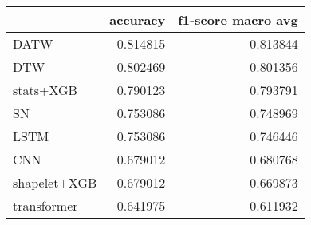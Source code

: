\begin{tabular}{lrr}
\toprule
 & accuracy & f1-score macro avg \\
\midrule
DATW & {\cellcolor[HTML]{08306B}} \color[HTML]{F1F1F1} 0.814815 & {\cellcolor[HTML]{08306B}} \color[HTML]{F1F1F1} 0.813844 \\
DTW & {\cellcolor[HTML]{084387}} \color[HTML]{F1F1F1} 0.802469 & {\cellcolor[HTML]{084082}} \color[HTML]{F1F1F1} 0.801356 \\
stats+XGB & {\cellcolor[HTML]{0B559F}} \color[HTML]{F1F1F1} 0.790123 & {\cellcolor[HTML]{084A91}} \color[HTML]{F1F1F1} 0.793791 \\
SN & {\cellcolor[HTML]{3D8DC4}} \color[HTML]{F1F1F1} 0.753086 & {\cellcolor[HTML]{3484BF}} \color[HTML]{F1F1F1} 0.748969 \\
LSTM & {\cellcolor[HTML]{3D8DC4}} \color[HTML]{F1F1F1} 0.753086 & {\cellcolor[HTML]{3787C0}} \color[HTML]{F1F1F1} 0.746446 \\
CNN & {\cellcolor[HTML]{CDE0F1}} \color[HTML]{000000} 0.679012 & {\cellcolor[HTML]{A9CFE5}} \color[HTML]{000000} 0.680768 \\
shapelet+XGB & {\cellcolor[HTML]{CDE0F1}} \color[HTML]{000000} 0.679012 & {\cellcolor[HTML]{BAD6EB}} \color[HTML]{000000} 0.669873 \\
transformer & {\cellcolor[HTML]{F7FBFF}} \color[HTML]{000000} 0.641975 & {\cellcolor[HTML]{F7FBFF}} \color[HTML]{000000} 0.611932 \\
\bottomrule
\end{tabular}
